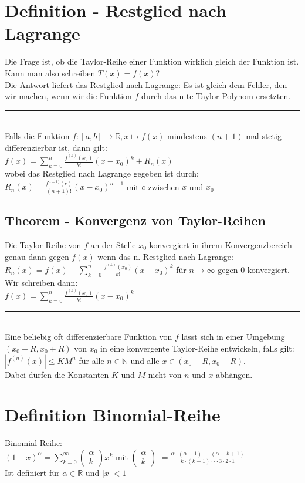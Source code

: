 \documentclass[../main.tex]{subfiles}
\begin{document}
\section{Definition - Restglied nach Lagrange}
Die Frage ist, ob die Taylor-Reihe einer Funktion wirklich gleich der Funktion ist. 
Kann man also schreiben $T(x)=f(x)$? \\
Die Antwort liefert das Restglied nach Lagrange: Es ist gleich dem Fehler, den wir machen,
wenn wir die Funktion $f$ durch das n-te Taylor-Polynom ersetzten.
\noindent\rule{8cm}{0.4pt} \\
Falls die Funktion $f:[a,b]\to\mathbb{R},x\mapsto f(x)$ mindestens $(n+1)$-mal stetig
differenzierbar ist, dann gilt: \\ [7pt]
$f(x)=\sum\limits_{k=0}^n\frac{f^{(k)}(x_0)}{k!}(x-x_0)^k+R_n(x)$ \\ [7pt]
wobei das Restglied nach Lagrange gegeben ist durch: \\ [7pt]
$R_n(x)=\frac{f^{n+1)}(c)}{(n+1)!}(x-x_0)^{n+1}$ mit $c$ zwischen $x$ und $x_0$


\subsection{Theorem - Konvergenz von Taylor-Reihen}
Die Taylor-Reihe von $f$ an der Stelle $x_0$ konvergiert in ihrem Konvergenzbereich genau
dann gegen $f(x)$ wenn das n. Restglied nach Lagrange: \\ [7pt]
$R_n(x)=f(x)-\sum\limits_{k=0}^n\frac{f^{(k)}(x_0)}{k!}(x-x_0)^k$ für $n\to\infty$ gegen $0$ konvergiert.\\[7pt]
Wir schreiben dann: \\[7pt]
$f(x)=\sum\limits_{k=0}^n\frac{f^{(k)}(x_0)}{k!}(x-x_0)^k$
\noindent\rule{8cm}{0.4pt} \\
Eine beliebig oft differenzierbare Funktion von $f$ lässt sich in einer Umgebung $(x_0-R,x_0+R)$
von $x_0$ in eine konvergente Taylor-Reihe entwickeln, falls gilt: \\ [7pt]
$|f^{(n)}(x)|\leq KM^n$ für alle $n\in\mathbb{N}$ und alle $x\in(x_0-R,x_0+R)$. \\ [7pt]
Dabei dürfen die Konstanten $K$ und $M$ nicht von $n$ und $x$ abhängen.

\section{Definition Binomial-Reihe}
Binomial-Reihe: \\ [7pt]
$(1+x)^\alpha=\sum\limits_{k=0}^\infty\begin{pmatrix}\alpha \\k\end{pmatrix}x^k$
mit $\begin{pmatrix}\alpha \\k\end{pmatrix}$ 
$=\frac{\alpha\cdot(\alpha-1)\cdot\cdot\cdot(\alpha-k+1)}{k\cdot(k-1)\cdot\cdot\cdot 3\cdot 2\cdot 1}$ \\ [7pt]
Ist definiert für $\alpha \in \mathbb{R}$ und $|x|<1$
\end{document}
